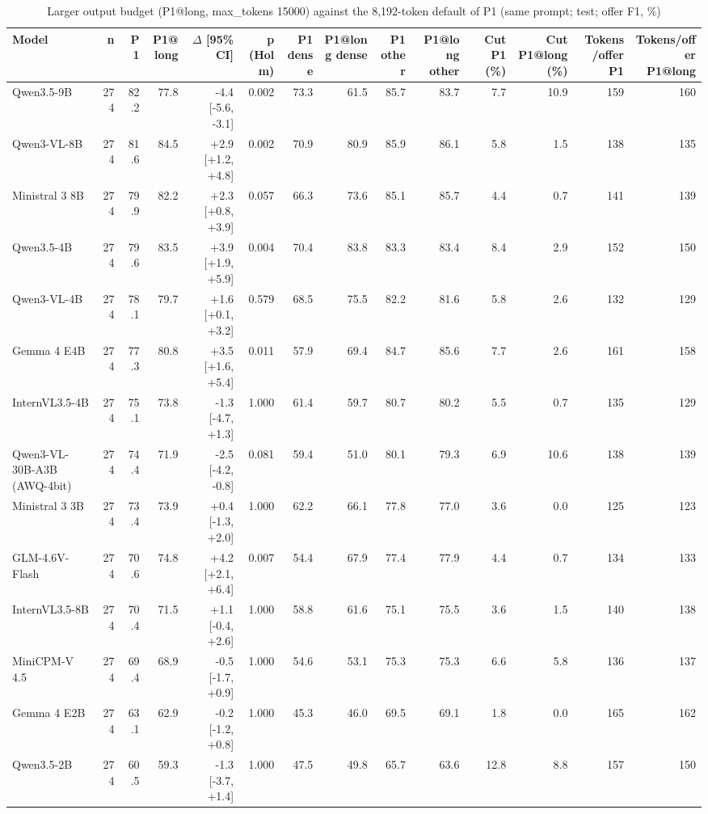 \begin{table}[t]
\centering
\caption{Larger output budget (P1@long, max\_tokens 15000) against the 8,192-token default of P1 (same prompt; test; offer F1, \%)}
\label{tab:longout}
\small
\begin{tabular}{lrrrrrrrrrrrrr}
\toprule
Model & n & P1 & P1@long & $\Delta$ [95\% CI] & p (Holm) & P1 dense & P1@long dense & P1 other & P1@long other & Cut P1 (\%) & Cut P1@long (\%) & Tokens/offer P1 & Tokens/offer P1@long \\
\midrule
Qwen3.5-9B & 274 & 82.2 & 77.8 & -4.4 [-5.6, -3.1] & 0.002 & 73.3 & 61.5 & 85.7 & 83.7 & 7.7 & 10.9 & 159 & 160 \\
Qwen3-VL-8B & 274 & 81.6 & 84.5 & +2.9 [+1.2, +4.8] & 0.002 & 70.9 & 80.9 & 85.9 & 86.1 & 5.8 & 1.5 & 138 & 135 \\
Ministral 3 8B & 274 & 79.9 & 82.2 & +2.3 [+0.8, +3.9] & 0.057 & 66.3 & 73.6 & 85.1 & 85.7 & 4.4 & 0.7 & 141 & 139 \\
Qwen3.5-4B & 274 & 79.6 & 83.5 & +3.9 [+1.9, +5.9] & 0.004 & 70.4 & 83.8 & 83.3 & 83.4 & 8.4 & 2.9 & 152 & 150 \\
Qwen3-VL-4B & 274 & 78.1 & 79.7 & +1.6 [+0.1, +3.2] & 0.579 & 68.5 & 75.5 & 82.2 & 81.6 & 5.8 & 2.6 & 132 & 129 \\
Gemma 4 E4B & 274 & 77.3 & 80.8 & +3.5 [+1.6, +5.4] & 0.011 & 57.9 & 69.4 & 84.7 & 85.6 & 7.7 & 2.6 & 161 & 158 \\
InternVL3.5-4B & 274 & 75.1 & 73.8 & -1.3 [-4.7, +1.3] & 1.000 & 61.4 & 59.7 & 80.7 & 80.2 & 5.5 & 0.7 & 135 & 129 \\
Qwen3-VL-30B-A3B (AWQ-4bit) & 274 & 74.4 & 71.9 & -2.5 [-4.2, -0.8] & 0.081 & 59.4 & 51.0 & 80.1 & 79.3 & 6.9 & 10.6 & 138 & 139 \\
Ministral 3 3B & 274 & 73.4 & 73.9 & +0.4 [-1.3, +2.0] & 1.000 & 62.2 & 66.1 & 77.8 & 77.0 & 3.6 & 0.0 & 125 & 123 \\
GLM-4.6V-Flash & 274 & 70.6 & 74.8 & +4.2 [+2.1, +6.4] & 0.007 & 54.4 & 67.9 & 77.4 & 77.9 & 4.4 & 0.7 & 134 & 133 \\
InternVL3.5-8B & 274 & 70.4 & 71.5 & +1.1 [-0.4, +2.6] & 1.000 & 58.8 & 61.6 & 75.1 & 75.5 & 3.6 & 1.5 & 140 & 138 \\
MiniCPM-V 4.5 & 274 & 69.4 & 68.9 & -0.5 [-1.7, +0.9] & 1.000 & 54.6 & 53.1 & 75.3 & 75.3 & 6.6 & 5.8 & 136 & 137 \\
Gemma 4 E2B & 274 & 63.1 & 62.9 & -0.2 [-1.2, +0.8] & 1.000 & 45.3 & 46.0 & 69.5 & 69.1 & 1.8 & 0.0 & 165 & 162 \\
Qwen3.5-2B & 274 & 60.5 & 59.3 & -1.3 [-3.7, +1.4] & 1.000 & 47.5 & 49.8 & 65.7 & 63.6 & 12.8 & 8.8 & 157 & 150 \\

\end{tabular}
\end{table}
